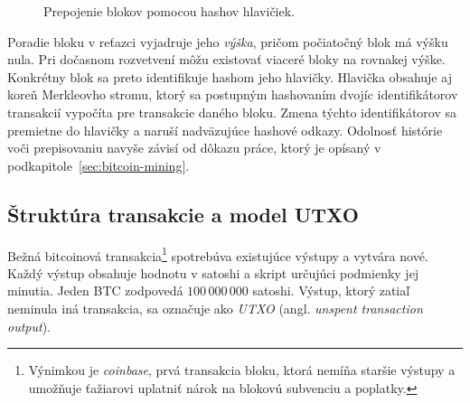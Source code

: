 \begin{figure}[htbp]
  \centering
  \caption{Prepojenie blokov pomocou hashov hlavičiek.}
  \label{fig:block-transaction-io}
\end{figure}

Poradie bloku v reťazci vyjadruje jeho \emph{výška}, pričom počiatočný
blok má výšku nula. Pri dočasnom rozvetvení môžu existovať viaceré bloky na rovnakej
výške. Konkrétny blok sa preto identifikuje hashom jeho hlavičky.
Hlavička obsahuje aj koreň Merkleovho stromu, ktorý sa postupným
hashovaním dvojíc identifikátorov transakcií vypočíta pre transakcie
daného bloku. Zmena týchto identifikátorov sa premietne do hlavičky
a naruší nadväzujúce hashové odkazy.
Odolnosť histórie voči prepisovaniu navyše závisí od dôkazu práce,
ktorý je opísaný v podkapitole~\ref{sec:bitcoin-mining}.

\subsection{Štruktúra transakcie a model UTXO}
\label{sec:bitcoin-utxo}

Bežná bitcoinová transakcia\footnote{Výnimkou je \emph{coinbase},
prvá transakcia bloku, ktorá nemíňa staršie výstupy a umožňuje
ťažiarovi uplatniť nárok na blokovú subvenciu a poplatky.}
spotrebúva existujúce výstupy a vytvára nové. Každý výstup obsahuje
hodnotu v satoshi a skript určujúci podmienky jej minutia.
Jeden BTC zodpovedá $100\,000\,000$ satoshi. Výstup, ktorý zatiaľ
neminula iná transakcia, sa označuje ako \emph{UTXO}
(angl. \emph{unspent transaction output}).

